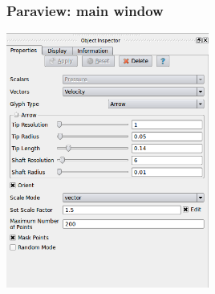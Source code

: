 \documentclass[12pt]{beamer}
\begin{document}
\begin{frame}
    \frametitle{Paraview: main window}
\begin{center}
\includegraphics[width=0.5\textwidth]{images/paraview_object.png}
\end{center}
\end{frame}
\end{document}
